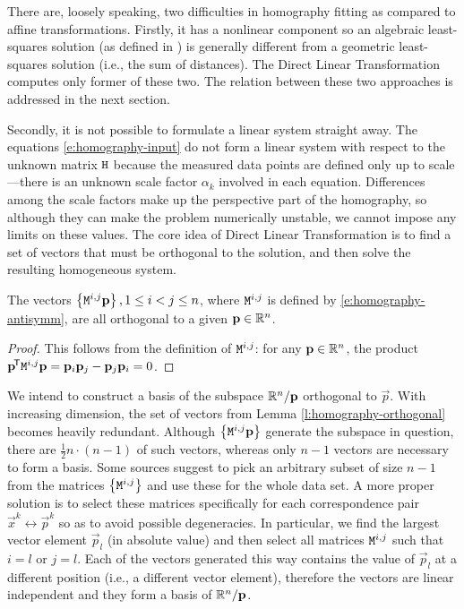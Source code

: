There are, loosely speaking, two difficulties in homography fitting as compared to affine transformations.
Firstly, it has a nonlinear component so an algebraic least-squares solution (as defined in \cite[p.93]{hartley03}) is generally different from a geometric least-squares solution (i.e., the sum of distances).
The Direct Linear Transformation computes only former of these two.
The relation between these two approaches is addressed in the next section.

Secondly, it is not possible to formulate a linear system straight away.
The equations \eqref{e:homography-input} do not form a linear system with respect to the unknown matrix $\mathtt{H}$ because the measured data points are defined only up to scale---there is an unknown scale factor $\alpha_k$ involved in each equation.
Differences among the scale factors make up the perspective part of the homography, so although they can make the problem numerically unstable, we cannot impose any limits on these values.
The core idea of Direct Linear Transformation is to find a set of vectors that must be orthogonal to the solution, and then solve the resulting homogeneous system.

\begin{lemma} \label{l:homography-orthogonal}
The vectors $\left\{ \mathtt{M}^{i, j} \mathbf{p} \right\}, 1 \leq i < j \leq n$, where $\mathtt{M}^{i,j}$ is defined by \eqref{e:homography-antisymm}, are all orthogonal to a given $\mathbf{p} \in \mathbb{R}^n$.
\end{lemma}
\begin{proof}
This follows from the definition of $\mathtt{M}^{i,j}$: for any $\mathbf{p} \in \mathbb{R}^n$, the product $\mathbf{p}^{\!\mathsf{T}} \mathtt{M}^{i, j} \mathbf{p} = \mathbf{p}_{i} \mathbf{p}_{j} - \mathbf{p}_{j} \mathbf{p}_{i} = 0$.
\end{proof}

We intend to construct a basis of the subspace $\mathbb{R}^n / \mathbf{p}$ orthogonal to $\vec p$.
With increasing dimension, the set of vectors from Lemma \ref{l:homography-orthogonal} becomes heavily redundant.
Although $\left\{ \mathtt{M}^{i, j} \mathbf{p} \right\}$ generate the subspace in question, there are $\frac {1} {2} n \cdot (n - 1)$ of such vectors, whereas only $n-1$ vectors are necessary to form a basis.
Some sources suggest to pick an arbitrary subset of size $n - 1$ from the matrices $\left\{ \mathtt{M}^{i, j} \right\}$ and use these for the whole data set.\cite{hartley03}
A more proper solution is to select these matrices specifically for each correspondence pair $\vec x^k \leftrightarrow \vec p^k$ so as to avoid possible degeneracies.
In particular, we find the largest vector element $\vec p_l$ (in absolute value) and then select all matrices $\mathtt{M}^{i, j}$ such that $i = l$ or $j = l$.
Each of the vectors generated this way contains the value of $\vec p_l$ at a different position (i.e., a different vector element), therefore the vectors are linear independent and they form a basis of $\mathbb{R}^n / \mathbf{p}$.

